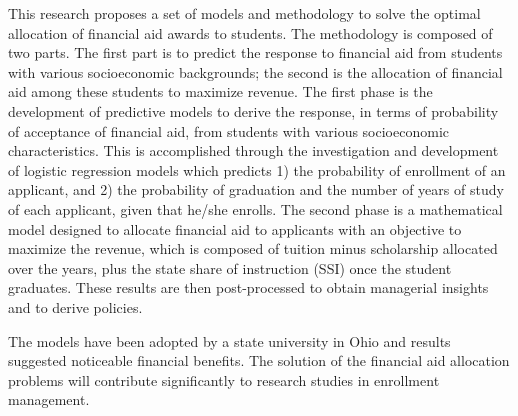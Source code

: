 \documentclass[12pt,english]{report}
\begin{document}
This research proposes a set of models and methodology to solve the optimal allocation of financial aid awards to students. The methodology is composed of two parts. The first part is to predict the response to financial aid from students with various socioeconomic backgrounds; the second is the allocation of financial aid among these students to maximize revenue. 
The first phase is the development of predictive models to derive the response, in terms of probability of acceptance of financial aid, from students with various socioeconomic characteristics. 
This is accomplished through the investigation and development of logistic regression models which predicts 1) the probability of enrollment of an applicant, and 2) the probability of graduation and the number of years of study of each applicant, given that he/she enrolls. The second phase is a mathematical model designed to allocate financial aid to applicants with an objective to maximize the revenue, which is composed of tuition minus scholarship allocated over the years, plus the state share of instruction (SSI) once the student graduates. These results are then post-processed to obtain managerial insights and to derive policies. 

The models have been adopted by a state university in Ohio and results suggested noticeable financial benefits. The solution of the financial aid allocation problems will contribute significantly to research studies in enrollment management.


\newpage 

\end{document}
